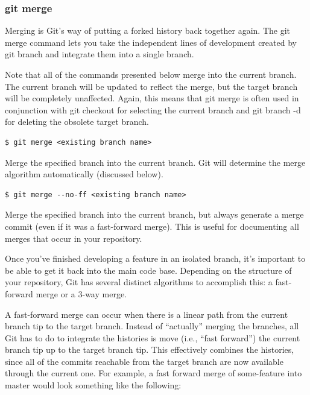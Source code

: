 \documentclass{article}
\begin{document}
\subsubsection*{git merge}

Merging is Git's way of putting a forked history back together
again. The git merge command lets you take the independent lines of
development created by git branch and integrate them into a single
branch. 

Note that all of the commands presented below merge into the current
branch. The current branch will be updated to reflect the merge, but
the target branch will be completely unaffected. Again, this means
that git merge is often used in conjunction with git checkout for
selecting the current branch and git branch -d for deleting the
obsolete target branch.

\begin{lstlisting}
$ git merge <existing branch name>
\end{lstlisting}

Merge the specified branch into the current branch. Git will determine
the merge algorithm automatically (discussed below). 

\begin{lstlisting}
$ git merge --no-ff <existing branch name>
\end{lstlisting}

Merge the specified branch into the current branch, but always
generate a merge commit (even if it was a fast-forward merge). This is
useful for documenting all merges that occur in your repository.

Once you've finished developing a feature in an isolated branch, it's
important to be able to get it back into the main code base. Depending
on the structure of your repository, Git has several distinct
algorithms to accomplish this: a fast-forward merge or a 3-way merge. 

A fast-forward merge can occur when there is a linear path from the
current branch tip to the target branch. Instead of ``actually'' merging
the branches, all Git has to do to integrate the histories is move
(i.e., ``fast forward'') the current branch tip up to the target branch
tip. This effectively combines the histories, since all of the commits
reachable from the target branch are now available through the current
one. For example, a fast forward merge of some-feature into master
would look something like the following: 
\end{document}
